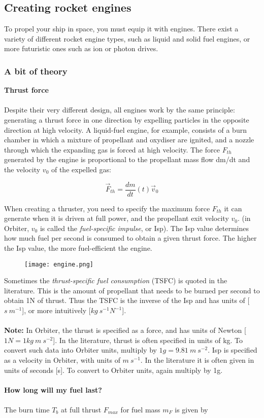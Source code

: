 \documentclass[Orbiter Developer Manual.tex]{subfiles}
\begin{document}
\subsection{Creating rocket engines}
To propel your ship in space, you must equip it with engines. There exist a variety of different rocket engine types, such as liquid and solid fuel engines, or more futuristic ones such as ion or photon drives.

\subsubsection{A bit of theory}
\textbf{Thrust force}\\
\\
Despite their very different design, all engines work by the same principle: generating a thrust force in one direction by expelling particles in the opposite direction at high velocity. A liquid-fuel engine, for example, consists of a burn chamber in which a mixture of propellant and oxydiser are ignited, and a nozzle through which the expanding gas is forced at high velocity. The force $F_{th}$ generated by the engine is proportional to the propellant mass flow dm/dt and the velocity $v_{0}$ of the expelled gas:

\[ \vec{F}_{th} = \frac{dm}{dt} (t) \vec{v}_{0}\]

\noindent
When creating a thruster, you need to specify the maximum force $F_{th}$ it can generate when it is driven at full power, and the propellant exit velocity $v_{0}$. (in Orbiter, $v_{0}$ is called the \textit{fuel-specific impulse}, or Isp). The Isp value determines how much fuel per second is consumed to obtain a given thrust force. The higher the Isp value, the more fuel-efficient the engine.\\

\begin{figure}[H]
  \centering
  \texttt{[image: engine.png]}
\end{figure}

\noindent
Sometimes the \textit{thrust-specific fuel consumption} (TSFC) is quoted in the literature. This is the amount of propellant that needs to be burned per second to obtain 1N of thrust. Thus the TSFC is the inverse of the Isp and has units of [$s \ m^{-1}$], or more intuitively [$kg \ s^{-1} N^{-1}$].\\
\\
\textbf{Note:} In Orbiter, the thrust is specified as a force, and has units of Newton [$1N = 1kg \ m \ s^{-2}$]. In the literature, thrust is often specified in units of kg. To convert such data into Orbiter units, multiply by $1g = 9.81 \ m \ s^{-2}$. Isp is specified as a velocity in Orbiter, with units of $m \ s^{-1}$. In the literature it is often given in units of seconds [s]. To convert to Orbiter units, again multiply by 1g.\\
\\
\textbf{How long will my fuel last?}\\
\\
The burn time $T_{b}$ at full thrust $F_{max}$ for fuel mass $m_{F}$ is given by
\end{document}
